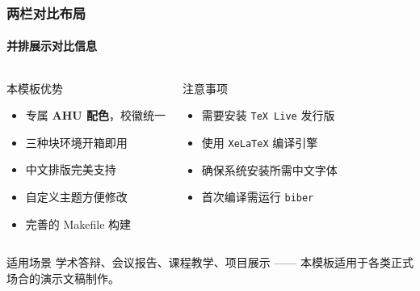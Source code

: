 \begin{frame}
\frametitle{两栏对比布局}
\framesubtitle{并排展示对比信息}

\begin{columns}[T]
\begin{block}{本模板优势}
\begin{itemize}
  \item 专属 \textbf{AHU 配色}，校徽统一
  \item 三种块环境开箱即用
  \item 中文排版完美支持
  \item 自定义主题方便修改
  \item 完善的 Makefile 构建
\end{itemize}
\end{block}

\begin{alertblock}{注意事项}
\begin{itemize}
  \item 需要安装 \texttt{TeX Live} 发行版
  \item 使用 \texttt{XeLaTeX} 编译引擎
  \item 确保系统安装所需中文字体
  \item 首次编译需运行 \texttt{biber}
\end{itemize}
\end{alertblock}
\end{columns}

\vspace{0.5em}

\begin{exampleblock}{适用场景}
学术答辩、会议报告、课程教学、项目展示 —— 本模板适用于各类正式场合的演示文稿制作。
\end{exampleblock}
\end{frame}
